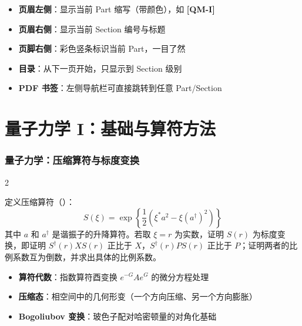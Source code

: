 \vspace{8pt}
\begin{cheatbox}[翻页提示]
\begin{itemize}[nosep]
    \item \textbf{页眉左侧}：显示当前 Part 缩写（带颜色），如 \textcolor{ustcblue}{\textbf{[QM-I]}}
    \item \textbf{页眉右侧}：显示当前 Section 编号与标题
    \item \textbf{页脚右侧}：彩色竖条标识当前 Part，一目了然
    \item \textbf{目录}：从下一页开始，只显示到 Section 级别
    \item \textbf{PDF 书签}：左侧导航栏可直接跳转到任意 Part/Section
\end{itemize}
\end{cheatbox}

\newpage

\tableofcontents
\newpage

\part{量子力学 I：基础与算符方法}\label{part:qm1}\setpartcolor{\value{part}}

\newpage
\newpage
\section{量子力学：压缩算符与标度变换}
\label{sec:squeezing}

\begin{multicols}{2}

\begin{modelbox}[题目：压缩算符的标度变换]
定义压缩算符（）：
\[
S(\xi) = \exp\left\{ \frac{1}{2}\left( \xi^* a^2 - \xi (a^\dagger)^2 \right) \right\}
\]
其中 $a$ 和 $a^\dagger$ 是谐振子的升降算符。若取 $\xi = r$ 为实数，证明 $S(r)$ 为标度变换，即证明 $S^\dagger(r) X S(r)$ 正比于 $X$，$S^\dagger(r) P S(r)$ 正比于 $P$；证明两者的比例系数互为倒数，并求出具体的比例系数。
\end{modelbox}

\begin{tipbox}[考点快速分析]
\begin{itemize}
    \item \textbf{算符代数}：指数算符酉变换 $e^{-G} A e^{G}$ 的微分方程处理
    \item \textbf{压缩态}：相空间中的几何形变（一个方向压缩、另一个方向膨胀）
    \item \textbf{Bogoliubov 变换}：玻色子配对哈密顿量的对角化基础
\end{itemize}
\end{tipbox}

\end{multicols}

